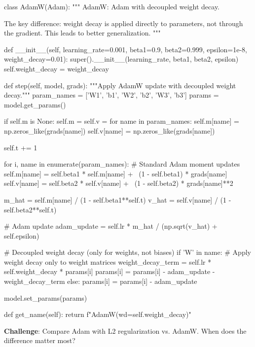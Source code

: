 \documentclass[../../main.tex]{subfiles}
\begin{document}
\begin{pythoncode}
class AdamW(Adam):
    """
    AdamW: Adam with decoupled weight decay.

    The key difference: weight decay is applied directly to parameters,
    not through the gradient. This leads to better generalization.
    """

    def __init__(self, learning_rate=0.001, beta1=0.9, beta2=0.999,
                 epsilon=1e-8, weight_decay=0.01):
        super().__init__(learning_rate, beta1, beta2, epsilon)
        self.weight_decay = weight_decay

    def step(self, model, grads):
        """Apply AdamW update with decoupled weight decay."""
        param_names = ['W1', 'b1', 'W2', 'b2', 'W3', 'b3']
        params = model.get_params()

        if self.m is None:
            self.m = {}
            self.v = {}
            for name in param_names:
                self.m[name] = np.zeros_like(grads[name])
                self.v[name] = np.zeros_like(grads[name])

        self.t += 1

        for i, name in enumerate(param_names):
            # Standard Adam moment updates
            self.m[name] = self.beta1 * self.m[name] + \
                          (1 - self.beta1) * grads[name]
            self.v[name] = self.beta2 * self.v[name] + \
                          (1 - self.beta2) * grads[name]**2

            m_hat = self.m[name] / (1 - self.beta1**self.t)
            v_hat = self.v[name] / (1 - self.beta2**self.t)

            # Adam update
            adam_update = self.lr * m_hat / (np.sqrt(v_hat) + self.epsilon)

            # Decoupled weight decay (only for weights, not biases)
            if 'W' in name:  # Apply weight decay only to weight matrices
                weight_decay_term = self.lr * self.weight_decay * params[i]
                params[i] = params[i] - adam_update - weight_decay_term
            else:
                params[i] = params[i] - adam_update

        model.set_params(params)

    def get_name(self):
        return f"AdamW(wd={self.weight_decay})"
\end{pythoncode}

\textbf{Challenge}: Compare Adam with L2 regularization vs. AdamW. When does the difference matter most?
\end{document}
